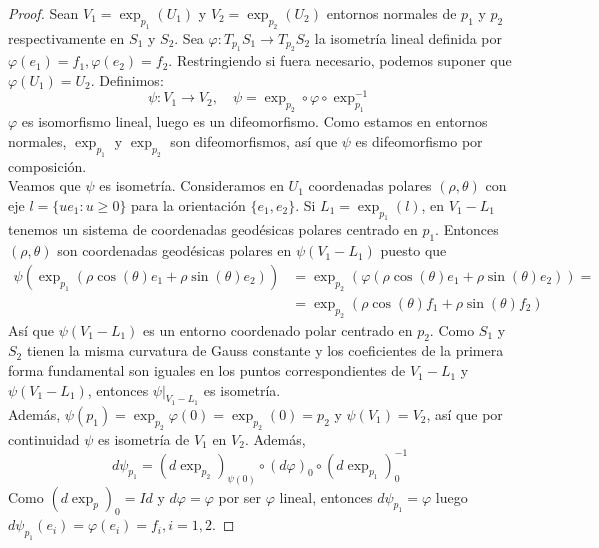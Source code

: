 \begin{theorem}
    \begin{proof}
        Sean $V_1 = \exp_{p_1}(U_1)$ y $V_2 = \exp_{p_2}(U_2)$ entornos normales de $p_1$ y $p_2$ respectivamente en $S_1$ y $S_2$.
        Sea $\varphi: T_{p_1}S_1 \to T_{p_2}S_2$ la isometría lineal definida por $\varphi(e_1) = f_1, \varphi(e_2) = f_2$.
        Restringiendo si fuera necesario, podemos suponer que $\varphi(U_1) = U_2$.
        Definimos: $$\psi: V_1 \to V_2, \quad \psi = \exp_{p_2} \circ \varphi \circ \exp_{p_1}^{-1}$$
        $\varphi$ es isomorfismo lineal, luego es un difeomorfismo.
        Como estamos en entornos normales, $\exp_{p_1}$ y $\exp_{p_2}$ son difeomorfismos, así que $\psi$ es difeomorfismo por composición.\\
        Veamos que $\psi$ es isometría.
        Consideramos en $U_1$ coordenadas polares $(\rho, \theta)$ con eje $l = \{ ue_1 : u \geq 0 \}$ para la orientación $\{ e_1, e_2 \}$.
        Si $L_1 = \exp_{p_1}(l)$, en $V_1 - L_1$ tenemos un sistema de coordenadas geodésicas polares centrado en $p_1$.
        Entonces $(\rho, \theta)$ son coordenadas geodésicas polares en $\psi(V_1 - L_1)$ puesto que
        \begin{align*}
            \psi(\exp_{p_1}(\rho \cos(\theta) e_1 + \rho \sin(\theta) e_2)) & = \exp_{p_2} (\varphi(\rho \cos(\theta) e_1 + \rho \sin(\theta) e_2)) = \\
                                                                            & = \exp_{p_2}(\rho \cos(\theta) f_1 + \rho \sin(\theta) f_2)
        \end{align*}
        Así que $\psi(V_1 - L_1)$ es un entorno coordenado polar centrado en $p_2$.
        Como $S_1$ y $S_2$ tienen la misma curvatura de Gauss constante y los coeficientes de la primera forma fundamental son iguales en los puntos correspondientes de $V_1 - L_1$ y $\psi(V_1 - L_1)$, entonces $\psi|_{V_1 - L_1}$ es isometría.\\
        Además, $\psi(p_1) = \exp_{p_2}\varphi(0) = \exp_{p_2}(0) = p_2$ y $\psi(V_1) = V_2$, así que por continuidad $\psi$ es isometría de $V_1$ en $V_2$.
        Además, $$d\psi_{p_1} = (d\exp_{p_2})_{\psi(0)} \circ (d\varphi)_0 \circ (d\exp_{p_1})_0^{-1}$$
        Como $(d\exp_p)_0 = Id$ y $d\varphi = \varphi$ por ser $\varphi$ lineal, entonces $d\psi_{p_1} = \varphi$ luego $d\psi_{p_1}(e_i) = \varphi(e_i) = f_i, i = 1, 2$.
    \end{proof}
\end{theorem}

